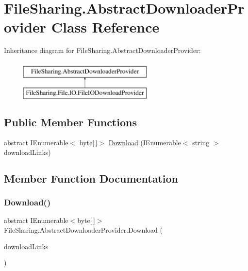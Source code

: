\hypertarget{class_file_sharing_1_1_abstract_downloader_provider}{}\section{File\+Sharing.\+Abstract\+Downloader\+Provider Class Reference}
\label{class_file_sharing_1_1_abstract_downloader_provider}
Inheritance diagram for File\+Sharing.\+Abstract\+Downloader\+Provider\+:\begin{figure}[H]
\begin{center}
\leavevmode
\includegraphics[height=2.000000cm]{class_file_sharing_1_1_abstract_downloader_provider}
\end{center}
\end{figure}
\subsection*{Public Member Functions}
\begin{DoxyCompactItemize}
\item 
abstract I\+Enumerable$<$ byte\mbox{[}$\,$\mbox{]}$>$ \hyperlink{class_file_sharing_1_1_abstract_downloader_provider_a38b11b25b2acda450d8406ca488585dd}{Download} (I\+Enumerable$<$ string $>$ download\+Links)
\end{DoxyCompactItemize}


\subsection{Member Function Documentation}
\mbox{\label{class_file_sharing_1_1_abstract_downloader_provider_a38b11b25b2acda450d8406ca488585dd}} 
\subsubsection{\texorpdfstring{Download()}{Download()}}
{\footnotesize\ttfamily abstract I\+Enumerable$<$byte\mbox{[}$\,$\mbox{]}$>$ File\+Sharing.\+Abstract\+Downloader\+Provider.\+Download (\begin{DoxyParamCaption}\item[{I\+Enumerable$<$ string $>$}]{download\+Links }\end{DoxyParamCaption})\hspace{0.3cm}{\ttfamily [pure virtual]}}



